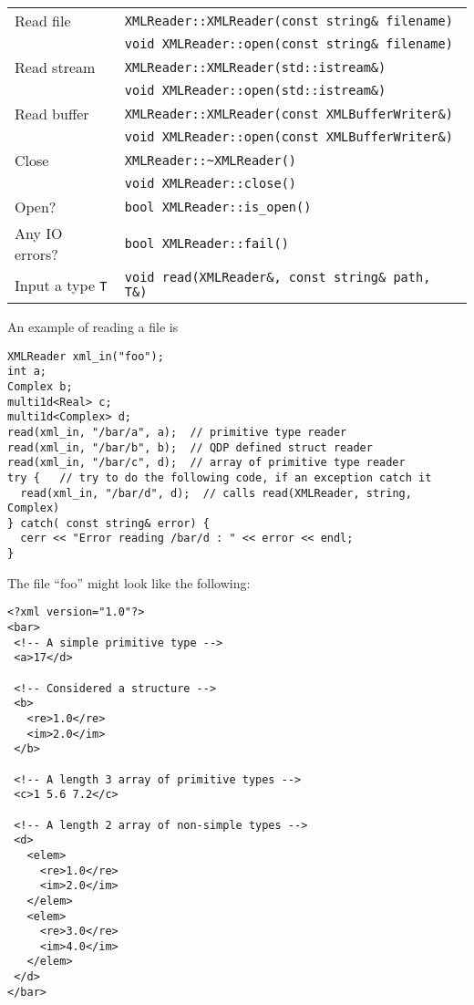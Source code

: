 \documentclass[12pt,letterpaper]{article}
\begin{document}
\begin{flushleft}
  \begin{tabular}{|l|l|}
  \hline
  Read file      & \verb|XMLReader::XMLReader(const string& filename)|\\
                 & \verb|void XMLReader::open(const string& filename)|\\
  \hline
  Read stream    & \verb|XMLReader::XMLReader(std::istream&)|\\
                 & \verb|void XMLReader::open(std::istream&)|\\
  \hline
  Read buffer    & \verb|XMLReader::XMLReader(const XMLBufferWriter&)|\\
                 & \verb|void XMLReader::open(const XMLBufferWriter&)|\\
  \hline
  Close          & \verb|XMLReader::~XMLReader()|\\
                 & \verb|void XMLReader::close()|\\
  \hline
  Open?          & \verb|bool XMLReader::is_open()| \\
  \hline
  Any IO errors? & \verb|bool XMLReader::fail()| \\
  \hline
  Input a type \verb|T| & \verb|void read(XMLReader&, const string& path, T&)| \\
  \hline
 \end{tabular}
\end{flushleft}
%
An example of reading a file is
\begin{verbatim}
XMLReader xml_in("foo");
int a;
Complex b;
multi1d<Real> c;
multi1d<Complex> d;
read(xml_in, "/bar/a", a);  // primitive type reader
read(xml_in, "/bar/b", b);  // QDP defined struct reader
read(xml_in, "/bar/c", d);  // array of primitive type reader
try {   // try to do the following code, if an exception catch it
  read(xml_in, "/bar/d", d);  // calls read(XMLReader, string, Complex) 
} catch( const string& error) { 
  cerr << "Error reading /bar/d : " << error << endl;
}
\end{verbatim}
%
The file ``foo'' might look like the following:
%
\begin{verbatim}
<?xml version="1.0"?>
<bar>
 <!-- A simple primitive type -->
 <a>17</d>

 <!-- Considered a structure -->
 <b>
   <re>1.0</re>
   <im>2.0</im>
 </b>

 <!-- A length 3 array of primitive types -->
 <c>1 5.6 7.2</c>

 <!-- A length 2 array of non-simple types -->
 <d>
   <elem>
     <re>1.0</re>
     <im>2.0</im>
   </elem>
   <elem>
     <re>3.0</re>
     <im>4.0</im>
   </elem>
 </d>
</bar>
\end{verbatim}
%
\end{document}
